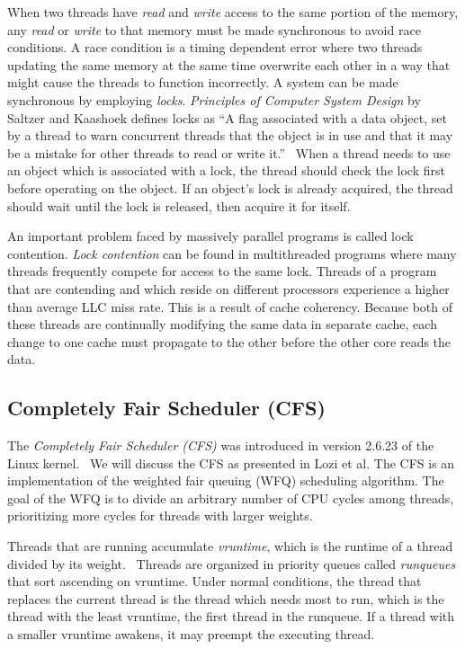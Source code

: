 \documentclass{sig-alternate}
\begin{document}
When two threads have \emph{read} and \emph{write} access to the same portion of the memory, any \emph{read} or \emph{write} to that memory must be made synchronous to avoid race conditions. A race condition is a timing dependent error where two threads updating the same memory at the same time overwrite each other in a way that might cause the threads to function incorrectly. A system can be made synchronous by employing \emph{locks}. \textit{Principles of Computer System Design} by Saltzer and Kaashoek defines locks as ``A flag associated with a data object, set by a thread to warn concurrent threads that the object is in use and that it may be a mistake for other threads to read or write it.''~\cite{Systems}
When a thread needs to use an object which is associated with a lock, the thread should check the lock first before operating on the object. If an object's lock is already acquired, the thread should wait until the lock is released, then acquire it for itself.

An important problem faced by massively parallel programs is called lock contention. \emph{Lock contention} can be found in multithreaded programs where many threads frequently compete for access to the same lock. Threads of a program that are contending and which reside on different processors experience a higher than average LLC miss rate. This is a result of cache coherency. Because both of these threads are continually modifying the same data in separate cache, each change to one cache must propagate to the other before the other core reads the data.


\subsection{Completely Fair Scheduler (CFS)}
\label{sec:cfs}

The \emph{Completely Fair Scheduler (CFS)} was introduced in version 2.6.23 of the Linux kernel.~\cite{Jo:2017} We will discuss the CFS as presented in Lozi et al. The CFS is an implementation of the weighted fair queuing (WFQ) scheduling algorithm. The goal of the WFQ is to divide an arbitrary number of CPU cycles among threads, prioritizing more cycles for threads with larger weights.~\cite{Lozi:2016}

Threads that are running accumulate \emph{vruntime}, which is the runtime of a thread divided by its weight.~\cite{SchedThesis} Threads are organized in priority queues called \emph{runqueues} that sort ascending on vruntime. Under normal conditions, the thread that replaces the current thread is the thread which needs most to run, which is the thread with the least vruntime, the first thread in the runqueue. If a thread with a smaller vruntime awakens, it may preempt the executing thread.~\cite{Lozi:2016}
\end{document}

